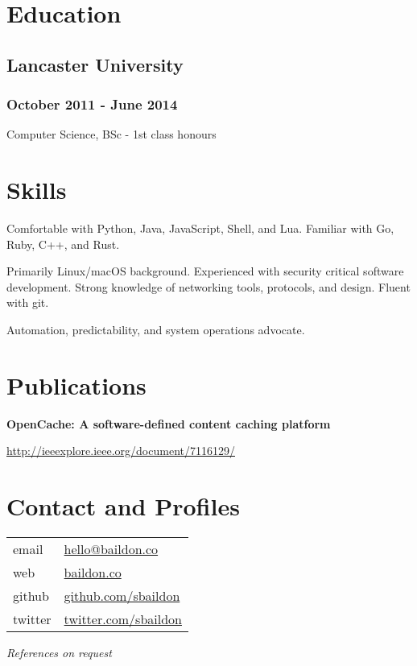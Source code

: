 \documentclass[a4paper,11pt]{article}
\begin{document}
\begin{multicols*}{2}
\section*{Education}
\subsection*{Lancaster University}
\subsubsection*{October 2011 - June 2014}
Computer Science, BSc - 1st class honours\par

\section*{Skills}
Comfortable with Python, Java, JavaScript, Shell, and Lua. Familiar with Go, Ruby, C++, and Rust.\medskip

Primarily Linux/macOS background. Experienced with security critical software development. Strong knowledge of networking tools, protocols, and design.  Fluent with git.\medskip

Automation, predictability, and system operations advocate.

\section*{Publications}
\textbf{OpenCache: A software-defined content caching platform}\par
\url{http://ieeexplore.ieee.org/document/7116129/}

\section*{Contact and Profiles}
\noindent \begin{tabular}{@{}ll}
email & \href{mailto:hello@baildon.co}{hello@baildon.co} \\
web & \href{https://baildon.co}{baildon.co} \\
github & \href{https://github.com/sbaildon}{github.com/sbaildon} \\
twitter & \href{https://twitter.com/sbaildon}{twitter.com/sbaildon}
\end{tabular}

\vspace{4ex}
\textit{References on request}

\end{multicols*}
\end{document}
